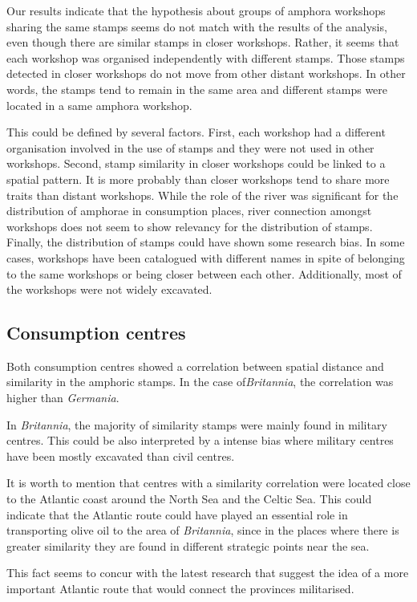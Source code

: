 \documentclass[review]{elsarticle}
\begin{document}
Our results indicate that the hypothesis about groups of amphora workshops sharing the same stamps seems do not match with the results of the analysis, even though there are similar stamps in closer workshops. Rather, it seems that each workshop was organised independently with different stamps. Those stamps detected in closer workshops do not move from other distant workshops. In other words, the stamps tend to remain in the same area and different stamps were located in a same amphora workshop. 

This could be defined by several factors. First, each workshop had a different organisation involved in the use of stamps and they were not used in other workshops. Second, stamp similarity in closer workshops could be linked to a spatial pattern. It is more probably than closer workshops tend to share more traits than distant workshops. While the role of the river was significant for the distribution of amphorae in consumption places, river connection amongst workshops does not seem to show relevancy for the distribution of stamps. Finally, the distribution of stamps could have shown some research bias. In some cases, workshops have been catalogued with different names in spite of belonging to the same workshops or being closer between each other. Additionally, most of the workshops were not widely excavated. 


\subsection{Consumption centres}

Both consumption centres showed a correlation between spatial distance and similarity in the amphoric stamps. In the case of\textit{Britannia}, the correlation was higher than \textit{Germania}.

In \textit{Britannia}, the majority of similarity stamps were mainly found in military centres. This could be also interpreted by a intense bias where military centres have been mostly excavated than civil centres. 

It is worth to mention that centres with a similarity correlation were located close to the Atlantic coast around the North Sea and the Celtic Sea. This could indicate that the Atlantic route could have played an essential role in transporting olive oil to the area of \textit{Britannia}, since in the places where there is greater similarity they are found in different strategic points near the sea.

This fact seems to concur with the latest research that suggest the idea of a more important Atlantic route that would connect the provinces militarised\citep{remesal_annona_1986,
remesal_provincial_2008,
carreras_atlantic_2012,
morillo_hispania_2016,rubio-campillo_provincias_2018}.
\end{document}
